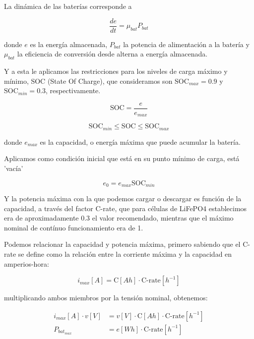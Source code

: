La dinámica de las baterías corresponde a

\begin{equation}
	\frac{de}{dt} = \mu_{bat} P_{bat}
\end{equation}

donde $e$ es la energía almacenada, $P_{bat}$ la potencia de alimentación a la
batería y $\mu_{bat}$ la eficiencia de conversión desde alterna a energía
almacenada.

Y a esta le aplicamos las restricciones para los niveles de carga máximo y
mínimo, SOC (State Of Charge), que consideramos son $\text{SOC}_{max} = 0.9$ y
$\text{SOC}_{min} = 0.3$, respectivamente.


\begin{equation}
	\text{SOC} = \frac{e}{e_{max}}
\end{equation}

\begin{equation}
	\text{SOC}_{min} \leq \text{SOC} \leq \text{SOC}_{max}
\end{equation}

donde $e_{max}$ es la capacidad, o energía máxima que puede acumular la batería.


Aplicamos como condición inicial que está en su punto mínimo de carga,
está 'vacía'

\begin{equation}
	e_0 = e_{max} \text{SOC}_{min}
\end{equation}

Y la potencia máxima con la que podemos cargar o descargar es función de la capacidad,
a través del factor C-rate, que para células de LiFePO4 establecimos era de aproximadamente
0.3 el valor recomendado, mientras que el máximo nominal de contínuo funcionamiento era de 1.

Podemos relacionar la capacidad y potencia máxima, primero sabiendo que
el C-rate se define como la relación entre la corriente máxima y la capacidad en amperios-hora:

\begin{equation}
	i_{max}[A] = \text{C}[Ah] \cdot \text{C-rate}[h^{-1}]
\end{equation}

multiplicando ambos miembros por la tensión nominal, obtenemos:

\begin{align}
	i_{max}[A] \cdot v[V] & = v[V] \cdot \text{C}[Ah] \cdot \text{C-rate}[h^{-1}] \\
	P_{bat_{max}}         & = e[Wh] \cdot \text{C-rate}[h^{-1}]
\end{align}

